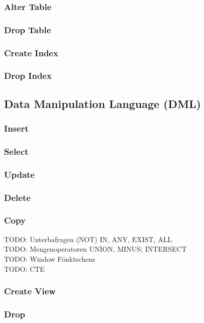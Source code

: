         \subsubsection{Alter Table}
            
        \subsubsection{Drop Table}
            
        \subsubsection{Create Index}
            
        \subsubsection{Drop Index}
            
    \subsection{Data Manipulation Language (DML)}
        \subsubsection{Insert}
            
        \subsubsection{Select}
            
        \subsubsection{Update}
            
        \subsubsection{Delete}
            
        \subsubsection{Copy}
            
    TODO: Unterbafragen (NOT) IN, ANY, EXIST, ALL \\
    TODO: Mengenoperatoren UNION, MINUS; INTERSECT \\
    TODO: Window Fönktschens \\
    TODO: CTE \\
        \subsubsection{Create View}
            
        \subsubsection{Drop}
            